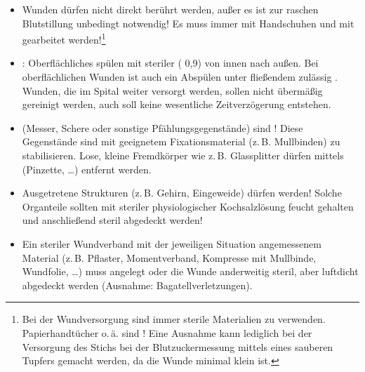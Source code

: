 \label{m:wundversorgung}
\begin{itemize}
  \item Wunden dürfen nicht direkt berührt werden, außer es
  ist zur raschen Blutstillung unbedingt notwendig! 
Es
  muss immer mit Handschuhen und mit 
  gearbeitet werden!\footnote{Bei der Wundversorgung sind
  immer sterile Materialien zu verwenden. Papierhandtücher
  o.\,ä. sind ! Eine Ausnahme kann
  lediglich bei der Versorgung des Stichs bei der
  Blutzuckermessung mittels eines sauberen Tupfers gemacht
  werden, da die Wunde minimal klein ist.}
  
  \item {}: Oberflächliches spülen mit
  steriler  (
  0,9\PC*) von innen
  nach außen. Bei oberflächlichen
  Wunden ist auch ein Abspülen unter fließendem  
  zulässig \cite{Fernandez2012}. 
  Wunden, die im Spital
  weiter versorgt werden, sollen nicht übermäßig gereinigt werden, 
  auch soll keine
  wesentliche Zeitverzögerung entstehen.  
  \item {} (Messer, Schere oder sonstige
  Pfählungsgegenstände) sind !
  Diese Gegenstände sind mit geeignetem Fixationsmaterial
  (z.\,B. Mullbinden) zu stabilisieren. Lose, kleine
  Fremdkörper wie z.\,B. Glassplitter dürfen mittels  (Pinzette, {\ldots}) entfernt
  werden.
  \item Ausgetretene Strukturen (z.\,B. Gehirn, Eingeweide)
  dürfen  werden! Solche Organteile
  sollten mit steriler physiologischer Kochsalzlösung
feucht gehalten und anschließend steril abgedeckt werden! 
  \item Ein steriler
  Wundverband mit der jeweiligen Situation angemessenem
  Material (z.\,B. Pflaster, Momentverband, Kompresse mit
  Mullbinde, Wundfolie, \ldots) muss angelegt oder die
  Wunde anderweitig steril, aber  luftdicht
  abgedeckt werden (Ausnahme: Bagatellverletzungen).
\end{itemize}